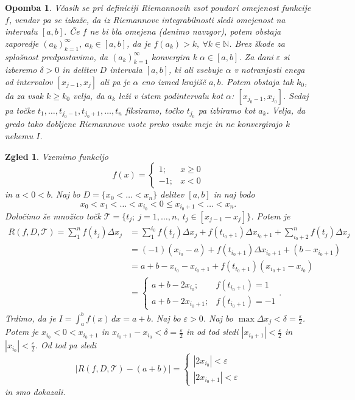 \documentclass[10pt, a4paper]{article}
\newtheorem*{opomba}{Opomba}
\newtheorem{zgled}[izr]{Zgled}
\newcommand{\N}{\mathbb {N}}
\begin{document}
\begin{opomba}
    Včasih se pri definiciji Riemannovih vsot poudari omejenost funkcije $f$, vendar pa se izkaže, da iz Riemannove integrabilnosti sledi omejenost na intervalu $[a, b].$
    Če $f$ ne bi bla omejena (denimo navzgor), potem obstaja zaporedje $(a_k)_{k = 1} ^{\infty},\ a_k \in [a, b]$, da je $f(a_k) > k,\ \forall k \in \N$.
    Brez škode za splošnost predpostavimo, da $(a_k)_{k = 1} ^{\infty}$ konvergira k $\alpha \in [a, b]$.
    Za dani $\varepsilon$ si izberemo $\delta > 0$ in delitev $D$ intervala $[a, b]$, ki ali vsebuje $\alpha$ v notranjosti enega od intervalov $[x_{j-1}, x_j]$ ali pa je $\alpha$ eno izmed krajišč $a, b$.
    Potem obstaja tak $k_0$, da za vsak $k \geq k_0$ velja, da $a_k$ leži v istem podintervalu kot $\alpha$: $[x_{j_0 -1}, x_{j_0}]$.
    Sedaj pa točke $t_1, \dots, t_{j_0 - 1}, t_{j_0 + 1}, \dots, t_{n}$ fiksiramo, točko $t_{j_0}$ pa izbiramo kot $a_k$. 
    Velja, da gredo tako dobljene Riemannove vsote preko vsake meje in ne konvergirajo k nekemu $I$.
\end{opomba}

\begin{zgled}
    Vzemimo funkcijo $$f(x) = \begin{cases}
        1 ;& x \geq 0\\
        -1 ;& x < 0
    \end{cases}$$ in $a < 0 < b.$ 
    Naj bo $D = \{x_0 < \dots < x_n\}$ delitev $[a, b]$ in naj bodo
    $$x_0 < x_1 < \dots < x_{i_0} < 0 \leq x_{i_0 +1} < \dots < x_n.$$
    Določimo še množico točk $\mathcal{T} = \{t_j;\ j = 1, \dots, n,\ t_j \in [x_{j-1} - x_j]\}$.
    Potem je 
    \begin{align*}
        R(f, D, \mathcal{T}) = \sum_1 ^n f(t_j) \Delta x_j
        &= \sum_1 ^{i_0} f(t_j) \Delta x_j + f(t_{i_0 +1}) \Delta x_{i_0 + 1} + \sum_{i_0 + 2} ^n f(t_j) \Delta x_j\\
        &= (-1) (x_{i_0} - a) + f(t_{i_0 + 1}) \Delta x_{i_0 + 1} + (b - x_{i_0 + 1})\\
        &= a+b -x_{i_0} - x_{i_0 + 1} + f(t_{t_0 + 1}) (x_{i_0 + 1} - x_{i_0})\\
        &= \begin{cases}
            a+ b - 2 x_{i_0} ;& f(t_{i_0 + 1}) = 1\\
            a +b - 2 x_{i_0 + 1} ;& f(t_{i_0 + 1}) = -1
        \end{cases}.
    \end{align*}
    Trdimo, da je $I = \int_a ^b f(x)\,dx = a + b$.
    Naj bo $\varepsilon > 0$. Naj bo $\max \Delta x_j < \delta = \frac{\varepsilon}{2}$.
    Potem je $x_{i_0} < 0 < x_{i_0 + 1}$ in $x_{i_0 +1} - x_{i_0} < \delta = \frac{\varepsilon}{2}$ in od tod sledi $|x_{i_0 + 1}| < \frac{\varepsilon}{2}$ in $|x_{i_0}| < \frac{\varepsilon}{2}$.
    Od tod pa sledi $$|R(f, D, \mathcal{T}) - (a+b)| = \begin{cases}
        |2 x_{i_0}| < \varepsilon\\
        |2 x_{i_0 + 1}| < \varepsilon
    \end{cases}$$ in smo dokazali.
\end{zgled}
\end{document}
